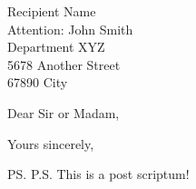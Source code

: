 \documentclass[
    paper=a4,                                                                               %
    version = last, 
    fontsize=11pt                                                                           %
]{scrlttr2}
\begin{document}
\begin{letter}{
    Recipient Name\\
    Attention: John Smith\\
    Department XYZ\\
    5678 Another Street\\
    67890 City
}

\opening{Dear Sir or Madam,}

\lipsum[1-5]


\closing{Yours sincerely,}

\ps{P.S. This is a post scriptum!}


\end{letter}

\end{document}
